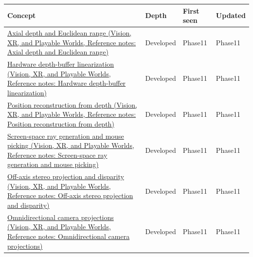 {\def\LTcaptype{none} %
\begin{longtable}[]{@{}
  >{\raggedright\arraybackslash}p{}
  >{\raggedright\arraybackslash}p{}
  >{\raggedright\arraybackslash}p{}
  >{\raggedright\arraybackslash}p{}@{}}
\toprule\noalign{}
\begin{minipage}[b]{\linewidth}\raggedright
Concept
\end{minipage} & \begin{minipage}[b]{\linewidth}\raggedright
Depth
\end{minipage} & \begin{minipage}[b]{\linewidth}\raggedright
First seen
\end{minipage} & \begin{minipage}[b]{\linewidth}\raggedright
Updated
\end{minipage} \\
\midrule\noalign{}
\endhead
\bottomrule\noalign{}
\endlastfoot
\href{../07-Vision-XR-and-Playable-Worlds/main.pdf\#nameddest=appendix-cac01ebeeb11}{Axial depth and Euclidean range (Vision, XR, and Playable Worlds, Reference notes: Axial depth and Euclidean range)} & Developed & Phase11 & Phase11 \\
\href{../07-Vision-XR-and-Playable-Worlds/main.pdf\#nameddest=appendix-1bc40b08db4a}{Hardware depth-buffer linearization (Vision, XR, and Playable Worlds, Reference notes: Hardware depth-buffer linearization)} & Developed & Phase11 & Phase11 \\
\href{../07-Vision-XR-and-Playable-Worlds/main.pdf\#nameddest=appendix-2cbf2968e866}{Position reconstruction from depth (Vision, XR, and Playable Worlds, Reference notes: Position reconstruction from depth)} & Developed & Phase11 & Phase11 \\
\href{../07-Vision-XR-and-Playable-Worlds/main.pdf\#nameddest=appendix-f1a6d43e80d1}{Screen-space ray generation and mouse picking (Vision, XR, and Playable Worlds, Reference notes: Screen-space ray generation and mouse picking)} & Developed & Phase11 & Phase11 \\
\href{../07-Vision-XR-and-Playable-Worlds/main.pdf\#nameddest=appendix-0976e86e5b9f}{Off-axis stereo projection and disparity (Vision, XR, and Playable Worlds, Reference notes: Off-axis stereo projection and disparity)} & Developed & Phase11 & Phase11 \\
\href{../07-Vision-XR-and-Playable-Worlds/main.pdf\#nameddest=appendix-fc99ad39f351}{Omnidirectional camera projections (Vision, XR, and Playable Worlds, Reference notes: Omnidirectional camera projections)} & Developed & Phase11 & Phase11 \\
\end{longtable}
}

